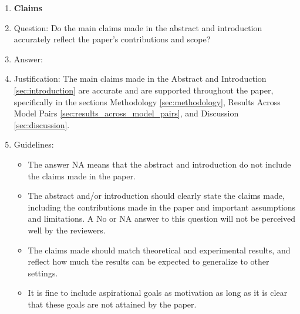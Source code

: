 \documentclass{article}
\begin{document}
\begin{enumerate}

\item {\bf Claims}
    \item[] Question: Do the main claims made in the abstract and introduction accurately reflect the paper's contributions and scope?
    \item[] Answer: \answerYes{} %
    \item[] Justification: The main claims made in the Abstract and Introduction \ref{sec:introduction} are accurate and are supported throughout the paper, specifically in the sections Methodology \ref{sec:methodology}, Results Across Model Pairs \ref{sec:results_across_model_pairs}, and Discussion \ref{sec:discussion}. 
    \item[] Guidelines:
    \begin{itemize}
        \item The answer NA means that the abstract and introduction do not include the claims made in the paper.
        \item The abstract and/or introduction should clearly state the claims made, including the contributions made in the paper and important assumptions and limitations. A No or NA answer to this question will not be perceived well by the reviewers. 
        \item The claims made should match theoretical and experimental results, and reflect how much the results can be expected to generalize to other settings. 
        \item It is fine to include aspirational goals as motivation as long as it is clear that these goals are not attained by the paper. 
    \end{itemize}


\end{enumerate}
\end{document}
